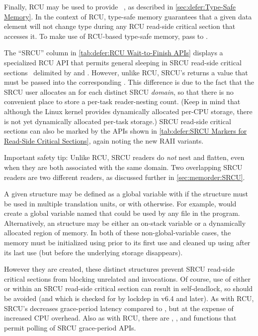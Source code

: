 Finally, RCU may be used to provide
~\cite{Cheriton96a}, as described in
\cref{sec:defer:Type-Safe Memory}.
In the context of RCU, type-safe memory guarantees that a given
data element will not change type during any RCU read-side critical section
that accesses it.
To make use of RCU-based type-safe memory, pass
 to .

The ``SRCU'' column in
\cref{tab:defer:RCU Wait-to-Finish APIs}
displays a specialized RCU API that permits general sleeping in SRCU
read-side critical
sections~\cite{PaulEMcKenney2006c}
delimited by  and .
However, unlike RCU, SRCU's  returns a value that
must be passed into the corresponding .
This difference is due to the fact that the SRCU user allocates an
 for each distinct SRCU \emph{domain}, so that there
is no convenient place to store a per-task reader-nesting count.
(Keep in mind that although the Linux kernel provides dynamically
allocated per-CPU storage, there is not yet dynamically allocated
per-task storage.)
SRCU read-side critical sections can also be marked by the APIs shown in
\cref{tab:defer:SRCU Markers for Read-Side Critical Sections}, again
noting the new RAII variants.

Important safety tip:
Unlike RCU, SRCU readers do \emph{not} nest and flatten, even when they
are both associated with the same  domain.
Two overlapping SRCU readers are two different readers, as discussed
further in
\cref{sec:memorder:SRCU}.

A given  structure may be defined as a global
variable with  if the structure must be used in
multiple translation units, or with  otherwise.
For example,  would create a global variable
named  that could be used by any file in the program.
Alternatively, an  structure may be either an on-stack
variable or a dynamically allocated region of memory.
In both of these non-global-variable cases, the memory must be initialized
using  prior to its first use and cleaned up
using  after its last use (but before the
underlying storage disappears).

However they are created, these distinct  structures
prevent SRCU read-side critical sections from blocking unrelated
 and 
invocations.
Of course, use of either  or
 within an SRCU read-side critical
section can result in self-deadlock, so should be avoided (and which
is checked for by lockdep in v6.4 and later).
As with RCU, SRCU's  decreases
grace-period latency compared to , but at
the expense of increased CPU overhead.
Also as with RCU, there are ,
, and 
functions that permit polling of SRCU grace-period APIs.

